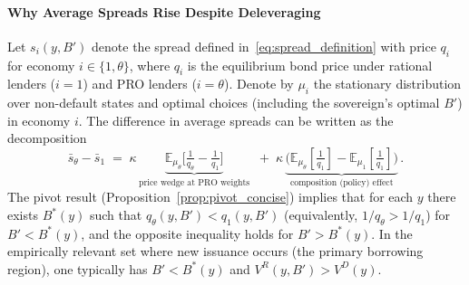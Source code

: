 \documentclass[12pt]{article}
\theoremstyle{plain}
\newcommand{\E}{\mathbb{E}}
\begin{document}
\paragraph{Why Average Spreads Rise Despite Deleveraging}
Let $s_i(y,B')$ denote the spread defined in~\eqref{eq:spread_definition} with
price $q_i$ for economy $i\in\{1,\theta\}$, where $q_i$ is the equilibrium bond
price under rational lenders ($i=1$) and PRO lenders ($i=\theta$). Denote by
$\mu_i$ the stationary distribution over non-default states and optimal choices
(including the sovereign's optimal $B'$) in economy $i$. The difference in
average spreads can be written as the decomposition
\begin{equation}\label{eq:spread_decomp}
	\bar s_\theta - \bar s_1 \;=\; \kappa\,\underbrace{\E_{\mu_\theta}\Big[\tfrac{1}{q_\theta}-\tfrac{1}{q_1}\Big]}_{\text{price wedge at PRO weights}}\;\; +\; \kappa\,\underbrace{\Big(\E_{\mu_\theta}\left[\tfrac{1}{q_1}\right] - \E_{\mu_1}\left[\tfrac{1}{q_1}\right]\Big)}_{\text{composition (policy) effect}}\,.
\end{equation}
The pivot result (Proposition~\ref{prop:pivot_concise}) implies that for each $y$ there exists $B^*(y)$ such that $q_\theta(y,B')<q_1(y,B')$ (equivalently, $1/q_\theta>1/q_1$) for $B'<B^*(y)$, and the opposite inequality holds for $B'>B^*(y)$. In the empirically relevant set where new issuance occurs (the primary borrowing region), one typically has $B'<B^*(y)$ and $V^R(y,B')>V^D(y)$.
\end{document}

